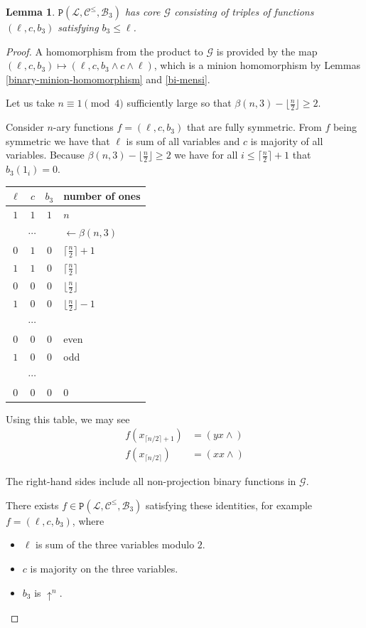 \documentclass{amsart}
\numberwithin{equation}{section}
\theoremstyle{plain}
\newtheorem{lemma}[theorem]{Lemma}
\theoremstyle{definition}
\def\clone#1{\mathcal{#1}}
\def\minion#1{\mathcal{#1}}
\def\Bc{\clone{B}}
\def\Lc{\clone{L}}
\def\Cc{\clone{C}}
\def\atleast#1{\uparrow^{#1}}
\def\C#1{{\mathtt{P}}(#1)}
\begin{document}
\begin{lemma}\label{lcleqb3} $\C{\Lc,\Cc^\leq,\Bc_3}$ has core $\minion{G}$ consisting of triples of functions $(\ell,c,b_3)$ satisfying $b_3 \leq \ell$.
\end{lemma}
\begin{proof}
  A homomorphism from the product to $\minion{G}$ is provided by the map $(\ell,c,b_3)\mapsto (\ell, c, b_3\wedge c\wedge \ell)$, which is a minion homomorphism by Lemmas \ref{binary-minion-homomorphism} and \ref{bi-mensi}.

Let us take $n\equiv 1\pmod 4$ sufficiently large so that $\beta(n,3) - \lfloor\frac{n}{2}\rfloor \geq 2$.

Consider $n$-ary functions $f= (\ell, c, b_3)$  that are fully symmetric.
From $f$ being symmetric we have that $\ell$ is sum of all variables and $c$ is majority of all variables. Because $\beta(n,3) - \lfloor\frac{n}{2}\rfloor \geq 2$ we have for all $i\leq \lceil\frac{n}{2}\rceil+1$ that $b_3(1_i)= 0$.

\begin{center}
\begin{tabular}{ |ccc|l } 
 \hline
 $\ell$ & $c$ & $b_3$ & number of ones \\ 
  \hline
     $1$ & $1$ & $1$ & $n$ \\ 
\multicolumn{3}{|c|}{$\cdots$} & \color{gray}$\longleftarrow\beta(n,3)$ \\
     $0$ & $1$ & $0$ & $\lceil\frac{n}{2}\rceil +1$ \\
     $1$ & $1$ & $0$ & $\lceil\frac{n}{2}\rceil$ \\
     $0$ & $0$ & $0$ & $\lfloor\frac{n}{2}\rfloor$ \\
     $1$ & $0$ & $0$ & $\lfloor\frac{n}{2}\rfloor -1$ \\ 
\multicolumn{3}{|c|}{$\cdots$} \\
     $0$ & $0$ & $0$ & even \\
     $1$ & $0$ & $0$ & odd \\
\multicolumn{3}{|c|}{$\cdots$} \\
     $0$ & $0$ & $0$ & $0$\\
 \hline
\end{tabular}
\end{center}

Using this table, we may see  
\begin{align*}
f(x_{\lceil n/2 \rceil +1}) &= (yx{\wedge}) \\
f(x_{\lceil n/2 \rceil}) &= (xx{\wedge})
\end{align*}

The right-hand sides include all non-projection binary functions in $\minion{G}$.

There exists $f\in\C{\Lc,\Cc^\leq,\Bc_3}$ satisfying these identities, for example $f=(\ell,c,b_3)$, where
\begin{itemize}
\item $\ell$ is sum of the three variables modulo $2$.
\item $c$ is majority on the three variables.
\item $b_3$ is $\atleast{n}$.
\end{itemize}
\end{proof}
\end{document}
